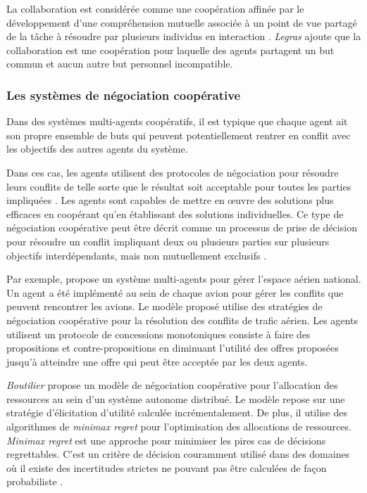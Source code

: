 			La collaboration est considérée comme une coopération affinée par le développement d'une compréhension mutuelle associée à un point de vue partagé de la tâche à résoudre par plusieurs individus en interaction \cite{weiss1999multiagent,blanquet2007web}. \emph{Legras} \cite{legrascooperation} ajoute que la collaboration est une coopération pour laquelle des agents partagent un but commun et aucun autre but personnel incompatible. 
			
			\subsubsection{Les systèmes de négociation coopérative}
			
			Dans des systèmes multi-agents coopératifs, il est typique que chaque agent ait son propre ensemble de buts qui peuvent potentiellement rentrer en conflit avec les objectifs des autres agents du système.
			
			Dans ces cas, les agents utilisent des protocoles de négociation pour résoudre leurs conflits de telle sorte que le résultat soit acceptable pour toutes les parties impliquées \cite{wollkind2004automated}. Les agents sont capables de mettre en œuvre des solutions plus efficaces en coopérant qu'en établissant des solutions individuelles. Ce type de négociation coopérative peut être décrit comme un processus de prise de décision pour résoudre un conflit impliquant deux ou plusieurs parties sur plusieurs objectifs interdépendants, mais non mutuellement exclusifs \cite{lewicki2011essentials}. 
			
			Par exemple, \cite{wollkind2004automated} propose un système multi-agents pour gérer l'espace aérien national. Un agent a été implémenté au sein de chaque avion pour gérer les conflits que peuvent rencontrer les avions. Le modèle proposé utilise des stratégies de négociation coopérative pour la résolution des conflits de trafic aérien. Les agents utilisent un protocole de concessions monotoniques \cite{zlotkin1989negotiation} consiste à faire des propositions et contre-propositions en diminuant l'utilité des offres proposées jusqu'à atteindre une offre qui peut être acceptée par les deux agents. 
			
			\emph{Boutilier} \cite{boutilier2002cooperative} propose un modèle de négociation coopérative pour l'allocation des ressources au sein d'un système autonome distribué. Le modèle repose sur une stratégie d'élicitation d'utilité calculée incrémentalement.  De plus, il utilise des algorithmes de \textit{minimax regret} pour l'optimisation des allocations de ressources. \textit{Minimax regret} est une approche pour minimiser les pires cas de décisions regrettables. C'est un critère de décision couramment utilisé dans des domaines où il existe des incertitudes strictes ne pouvant pas être calculées de façon probabiliste \cite{borodin2005online}.   
			
